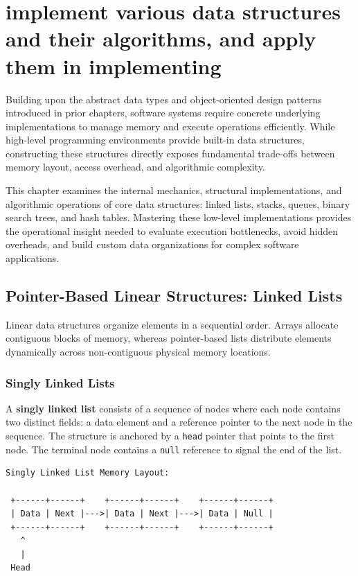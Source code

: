 \documentclass[12pt]{report}
\begin{document}
\pagestyle{plain}
\setcounter{page}{20}
\setcounter{chapter}{2}
\chapter{implement various data structures and their algorithms, and apply them in implementing}

Building upon the abstract data types and object-oriented design patterns introduced in prior chapters, software systems require concrete underlying implementations to manage memory and execute operations efficiently. While high-level programming environments provide built-in data structures, constructing these structures directly exposes fundamental trade-offs between memory layout, access overhead, and algorithmic complexity.

This chapter examines the internal mechanics, structural implementations, and algorithmic operations of core data structures: linked lists, stacks, queues, binary search trees, and hash tables. Mastering these low-level implementations provides the operational insight needed to evaluate execution bottlenecks, avoid hidden overheads, and build custom data organizations for complex software applications.

\section{Pointer-Based Linear Structures: Linked Lists}

Linear data structures organize elements in a sequential order. Arrays allocate contiguous blocks of memory, whereas pointer-based lists distribute elements dynamically across non-contiguous physical memory locations.

\subsection{Singly Linked Lists}

A \textbf{singly linked list} consists of a sequence of nodes where each node contains two distinct fields: a data element and a reference pointer to the next node in the sequence. The structure is anchored by a \texttt{head} pointer that points to the first node. The terminal node contains a \texttt{null} reference to signal the end of the list.

\begin{verbatim}
Singly Linked List Memory Layout:

 +------+------+    +------+------+    +------+------+
 | Data | Next |--->| Data | Next |--->| Data | Null |
 +------+------+    +------+------+    +------+------+
   ^
   |
 Head
\end{verbatim}
\end{document}
